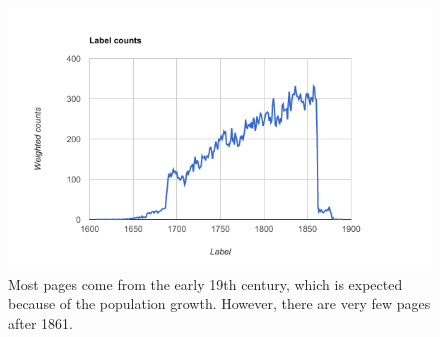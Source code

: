 
\begin{figure}
    \centering
    \includegraphics[scale=0.6]{resources/label_counts.png}
    \caption{Most pages come from the early 19th century, which is expected because of the population growth. However, there are very few pages after 1861.}
    \label{fig:label_counts}
\end{figure}
